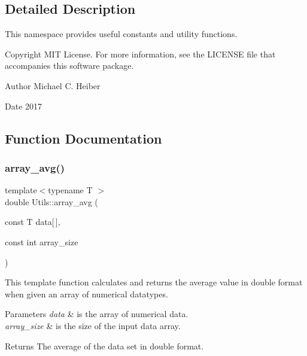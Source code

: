 \subsection{Detailed Description}
This namespace provides useful constants and utility functions. 

\begin{DoxyCopyright}{Copyright}
M\+IT License. For more information, see the L\+I\+C\+E\+N\+SE file that accompanies this software package. 
\end{DoxyCopyright}
\begin{DoxyAuthor}{Author}
Michael C. Heiber 
\end{DoxyAuthor}
\begin{DoxyDate}{Date}
2017 
\end{DoxyDate}


\subsection{Function Documentation}
\mbox{\label{namespace_utils_aa76a204af4dd4c3eb151691825de2eb2}} 
\subsubsection{\texorpdfstring{array\+\_\+avg()}{array\_avg()}}
{\footnotesize\ttfamily template$<$typename T $>$ \\
double Utils\+::array\+\_\+avg (\begin{DoxyParamCaption}\item[{const T}]{data\mbox{[}$\,$\mbox{]},  }\item[{const int}]{array\+\_\+size }\end{DoxyParamCaption})}



This template function calculates and returns the average value in double format when given an array of numerical datatypes. 


\begin{DoxyParams}{Parameters}
{\em data} & is the array of numerical data. \\
\hline
{\em array\+\_\+size} & is the size of the input data array. \\
\hline
\end{DoxyParams}
\begin{DoxyReturn}{Returns}
The average of the data set in double format. 
\end{DoxyReturn}
\mbox{\label{namespace_utils_a25d09c704b5ae03f01cf76b6de10aa19}} 
